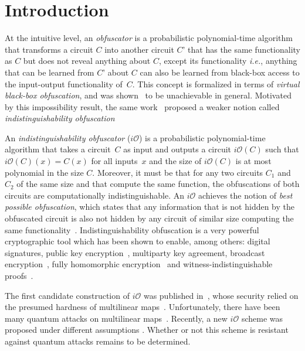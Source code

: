 \section{Introduction}
At the intuitive level, an \emph{obfuscator} is a probabilistic polynomial-time algorithm that  transforms a circuit $C$ into another circuit $C’$ that has the same functionality as $C$ but does not reveal anything about $C$, except its functionality \emph{i.e.}, anything that can be learned from $C’$ about $C$ can also be learned from  black-box access to the input-output functionality of~$C$. This concept is formalized in terms of \emph{virtual black-box obfuscation}, and was shown~\cite{BGI+12} to be unachievable in general.
Motivated by this impossibility result, the same work~\cite{BGI+12} proposed a weaker notion called \emph{indistinguishability obfuscation} 

An \emph{indistinguishability obfuscator} ($i\mathcal{O}$) is a probabilistic polynomial-time algorithm that takes a circuit~$C$ as  input and outputs a circuit $i\mathcal{O}(C)$ such that $i\mathcal{O}(C)(x)=C(x)$ for all inputs~$x$ and the size of $i\mathcal{O}(C)$ is at most polynomial in the size $C$. Moreover, it must be that for any two circuits $C_1$ and $C_2$ of the same size and that compute the same function, the obfuscations of both circuits are computationally indistinguishable. An $i\mathcal{O}$ achieves the notion of \emph{best possible obfuscation}, which states that any information that is not hidden by the obfuscated circuit is also not hidden by any  circuit of similar size computing the same functionality~\cite{GR14}. Indistinguishability obfuscation is a very powerful cryptographic tool which has been shown to enable, among others: digital signatures, public key encryption~\cite{SW14}, multiparty key agreement, broadcast encryption~\cite{BZ14}, fully homomorphic encryption~\cite{CLTV15} and witness-indistinguishable proofs~\cite{BP15}.

The first candidate construction of $i\mathcal{O}$ was published in~\cite{GGH+13}, whose security relied on the presumed hardness of multilinear maps~\cite{CLT13, LSS14, GGH15}. Unfortunately, there have been many quantum attacks on  multilinear maps~\cite{ABD16, CDPR16, CGH17}.  Recently, a new $i\mathcal{O}$ scheme was proposed under  different assumptions \cite{AJL+19}. Whether or not this scheme is resistant against quantum attacks remains to be determined.

